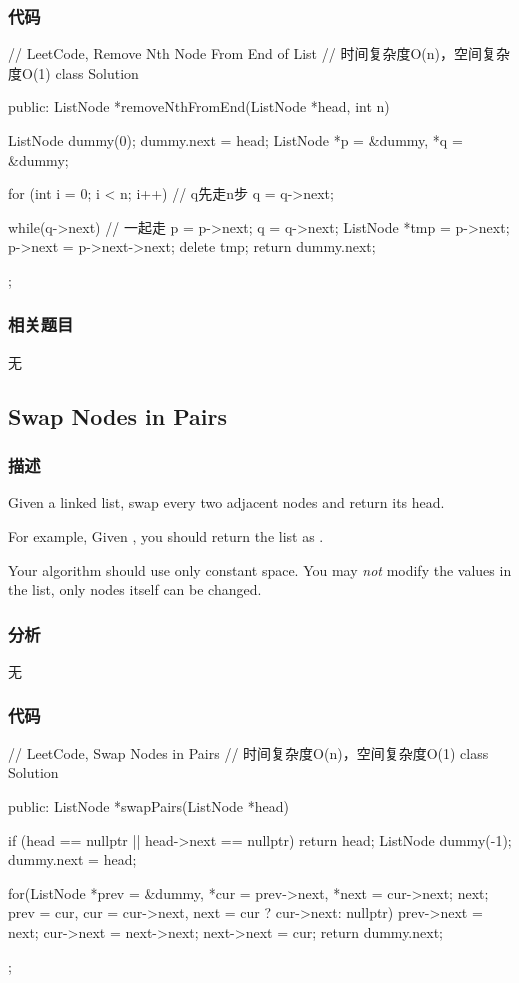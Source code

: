 \subsubsection{代码}
\begin{Code}
// LeetCode, Remove Nth Node From End of List
// 时间复杂度O(n)，空间复杂度O(1)
class Solution {
public:
    ListNode *removeNthFromEnd(ListNode *head, int n) {
        ListNode dummy(0);
        dummy.next = head;
        ListNode *p = &dummy, *q = &dummy;

        for (int i = 0; i < n; i++)  // q先走n步
            q = q->next;

        while(q->next) { // 一起走
            p = p->next;
            q = q->next;
        }
        ListNode *tmp = p->next;
        p->next = p->next->next;
        delete tmp;
        return dummy.next;
    }
};
\end{Code}


\subsubsection{相关题目}

\begindot
\item 无
\myenddot


\subsection{Swap Nodes in Pairs}
\label{sec:swap-nodes-in-pairs}


\subsubsection{描述}
Given a linked list, swap every two adjacent nodes and return its head.

For example,
Given , you should return the list as .

Your algorithm should use only constant space. You may \emph{not} modify the values in the list, only nodes itself can be changed.


\subsubsection{分析}
无


\subsubsection{代码}
\begin{Code}
// LeetCode, Swap Nodes in Pairs
// 时间复杂度O(n)，空间复杂度O(1)
class Solution {
public:
    ListNode *swapPairs(ListNode *head) {
        if (head == nullptr || head->next == nullptr) return head;
        ListNode dummy(-1);
        dummy.next = head;

        for(ListNode *prev = &dummy, *cur = prev->next, *next = cur->next;
                next;
                prev = cur, cur = cur->next, next = cur ? cur->next: nullptr) {
            prev->next = next;
            cur->next = next->next;
            next->next = cur;
        }
        return dummy.next;
    }
};
\end{Code}

